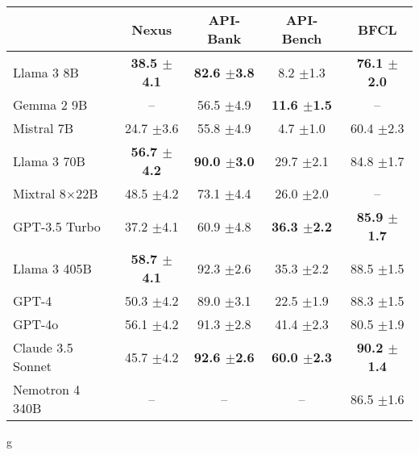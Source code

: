 \begin{NiceTabular}{lcccc}
	\CodeBefore
	\Body
	\toprule
&\textbf{Nexus} & \textbf{API-Bank} & \textbf{API-Bench} & \textbf{BFCL}\\
 \midrule
	Llama 3 8B & \textbf{38.5 \scriptsize{$\pm$4.1}}& \textbf{82.6 \scriptsize{$\pm$3.8}}& 8.2 \scriptsize{$\pm$1.3}& \textbf{76.1 \scriptsize{$\pm$2.0}}\\
	Gemma 2 9B &--& 56.5 \scriptsize{$\pm$4.9}& \textbf{11.6 \scriptsize{$\pm$1.5}}& --\\
	Mistral 7B &24.7 \scriptsize{$\pm$3.6}& 55.8 \scriptsize{$\pm$4.9}& 4.7 \scriptsize{$\pm$1.0}& 60.4 \scriptsize{$\pm$2.3}\\
	\midrule
	Llama 3 70B & \textbf{56.7 \scriptsize{$\pm$4.2}}& \textbf{90.0 \scriptsize{$\pm$3.0}}& 29.7 \scriptsize{$\pm$2.1}& 84.8 \scriptsize{$\pm$1.7}\\
	Mixtral 8$\times$22B &48.5 \scriptsize{$\pm$4.2}& 73.1 \scriptsize{$\pm$4.4}& 26.0 \scriptsize{$\pm$2.0}& --\\
	GPT-3.5 Turbo &37.2 \scriptsize{$\pm$4.1}& 60.9 \scriptsize{$\pm$4.8}& \textbf{36.3 \scriptsize{$\pm$2.2}}& \textbf{85.9 \scriptsize{$\pm$1.7}}\\
	\midrule
	Llama 3 405B & \textbf{58.7 \scriptsize{$\pm$4.1}}& 92.3 \scriptsize{$\pm$2.6}& 35.3 \scriptsize{$\pm$2.2}& 88.5 \scriptsize{$\pm$1.5}\\
	GPT-4 &50.3 \scriptsize{$\pm$4.2}& 89.0 \scriptsize{$\pm$3.1}& 22.5 \scriptsize{$\pm$1.9}& 88.3 \scriptsize{$\pm$1.5}\\
	GPT-4o &56.1 \scriptsize{$\pm$4.2}& 91.3 \scriptsize{$\pm$2.8}& 41.4 \scriptsize{$\pm$2.3}& 80.5 \scriptsize{$\pm$1.9}\\
	Claude 3.5 Sonnet &45.7 \scriptsize{$\pm$4.2}& \textbf{92.6 \scriptsize{$\pm$2.6}}& \textbf{60.0 \scriptsize{$\pm$2.3}}& \textbf{90.2 \scriptsize{$\pm$1.4}}\\
	Nemotron 4 340B &--& --& --& 86.5 \scriptsize{$\pm$1.6}\\
	\bottomrule
\end{NiceTabular}
g

